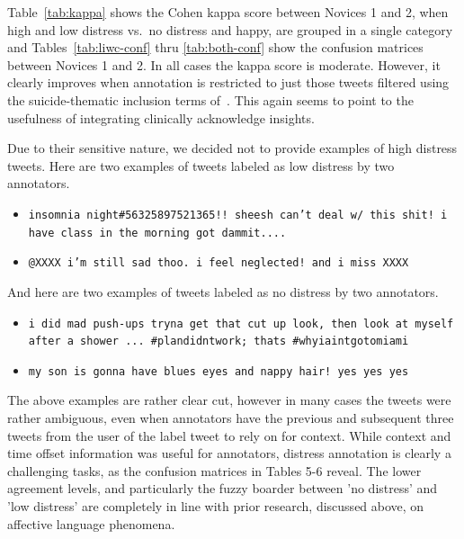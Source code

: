 \documentclass[11pt]{article}
\begin{document}
Table~\ref{tab:kappa} shows the Cohen kappa score between Novices 1 and 2, when high and low distress vs.\ no distress and happy, are grouped in a single category and Tables~\ref{tab:liwc-conf} thru \ref{tab:both-conf} show the confusion matrices between Novices 1 and 2. In all cases the kappa score is moderate. However, it clearly improves when annotation is restricted to just those tweets filtered using the suicide-thematic inclusion terms of~. This again seems to point to the usefulness of integrating clinically acknowledge insights.




Due to their sensitive nature, we decided not to provide examples of high distress tweets. Here are two examples of tweets labeled as low distress by two annotators. 
\begin{itemize}
\footnotesize
\item \texttt{insomnia night\#56325897521365!! sheesh can't deal w/ this shit! i have class in the morning got dammit.... }

\item \texttt{@XXXX i'm still sad thoo. i feel neglected! and i miss XXXX }
\end{itemize}

And here are two examples of tweets labeled as no distress by two annotators.

\begin{itemize}
\footnotesize
\item \texttt{i did mad push-ups tryna get that cut up look, then look at myself after a shower ... \#plandidntwork; thats \#whyiaintgotomiami}

\item \texttt{my son is gonna have blues eyes and nappy hair! yes yes yes}
\end{itemize}

The above examples are rather clear cut, however in many cases the tweets were rather ambiguous, even when annotators have the previous and subsequent three tweets from the user of the label tweet to rely on for context. While context and time offset information was useful for annotators, distress annotation is clearly a challenging tasks, as the confusion matrices in Tables 5-6 reveal. The lower agreement levels, and particularly the fuzzy boarder between 'no distress' and 'low distress' are completely in line with prior research, discussed above, on affective language phenomena.
\end{document}
